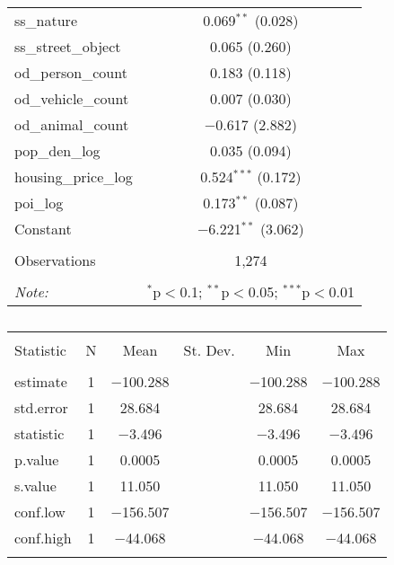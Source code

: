 \begin{table}[!htbp]
\begin{tabular}{@{\extracolsep{1pt}}lc}
  ss\_nature & 0.069$^{**}$ (0.028) \\ 
  ss\_street\_object & 0.065 (0.260) \\ 
  od\_person\_count & 0.183 (0.118) \\ 
  od\_vehicle\_count & 0.007 (0.030) \\ 
  od\_animal\_count & $-$0.617 (2.882) \\ 
  pop\_den\_log & 0.035 (0.094) \\ 
  housing\_price\_log & 0.524$^{***}$ (0.172) \\ 
  poi\_log & 0.173$^{**}$ (0.087) \\ 
  Constant & $-$6.221$^{**}$ (3.062) \\ 
 \hline \\[-1.8ex] 
Observations & 1,274 \\ 
\hline 
\hline \\[-1.8ex] 
\textit{Note:}  & \multicolumn{1}{r}{$^{*}$p$<$0.1; $^{**}$p$<$0.05; $^{***}$p$<$0.01} \\ 
\end{tabular} 
\end{table} 

\begin{table}[!htbp] \centering 
  \caption{} 
  \label{} 
\small 
\begin{tabular}{@{\extracolsep{1pt}}lccccc} 
\\[-1.8ex]\hline 
\hline \\[-1.8ex] 
Statistic & \multicolumn{1}{c}{N} & \multicolumn{1}{c}{Mean} & \multicolumn{1}{c}{St. Dev.} & \multicolumn{1}{c}{Min} & \multicolumn{1}{c}{Max} \\ 
\hline \\[-1.8ex] 
estimate & 1 & $-$100.288 &  & $-$100.288 & $-$100.288 \\ 
std.error & 1 & 28.684 &  & 28.684 & 28.684 \\ 
statistic & 1 & $-$3.496 &  & $-$3.496 & $-$3.496 \\ 
p.value & 1 & 0.0005 &  & 0.0005 & 0.0005 \\ 
s.value & 1 & 11.050 &  & 11.050 & 11.050 \\ 
conf.low & 1 & $-$156.507 &  & $-$156.507 & $-$156.507 \\ 
conf.high & 1 & $-$44.068 &  & $-$44.068 & $-$44.068 \\ 
\hline \\[-1.8ex] 
\end{tabular} 
\end{table} 


